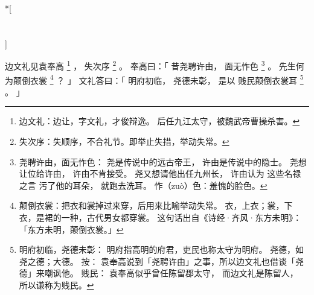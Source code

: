 
\switchcolumn[0]*[\section{}]

边文礼见袁奉高%
\footnote{%
    边文礼：边让，字文礼，才俊辩逸。
            后任九江太守，被魏武帝曹操杀害。
}%
，
失次序%
\footnote{%
    失次序：失顺序，不合礼节。即举止失措，举动失常。
}%
。
奉高曰：「
    昔尧聘许由，
    面无怍色%
    \footnote{%
        尧聘许由，面无怍色：
            尧是传说中的远古帝王，
            许由是传说中的隐士。
            尧想让位给许由，
            许由不肯接受。
            尧又想请他出任九州长，
            许由认为
            这些名禄之言
            污了他的耳朵，
            就跑去洗耳。
        怍（zuò）色：羞愧的脸色。
    }%
    。
    先生何为颠倒衣裳%
    \footnote{%
        颠倒衣裳：把衣和裳掉过来穿，后用来比喻举动失常。
                  衣，上衣；裳，下衣，是裙的一种，古代男女都穿裳。
                  这句话出自《诗经·齐风·东方未明》：
                  「东方未明，颠倒衣裳。」
    }%
    ？
」
文礼答曰：「
    明府初临，
    尧德未彰，
    是以
    贱民颠倒衣裳耳%
    \footnote{%
        明府初临，尧德未彰：
            明府指高明的府君，吏民也称太守为明府。
            尧德，如尧之德；大德。
            按：
            袁奉高说到「尧聘许由」之事，所以边文礼也借谈「尧德」来嘲讽他。
        贱民：
            袁奉高似乎曾任陈留郡太守，
            而边文礼是陈留人，
            所以谦称为贱民。
    }%
    。
」

\switchcolumn


